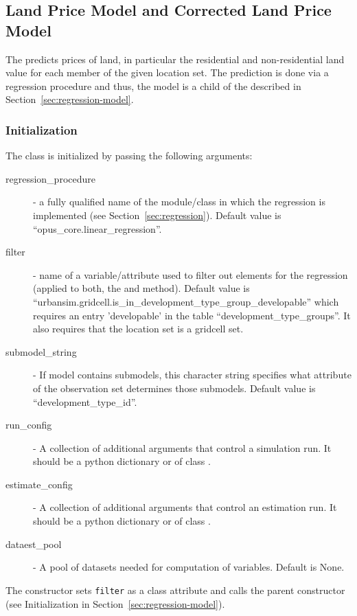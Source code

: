 \subsection{Land Price Model and Corrected Land Price Model}
\label{sec:land-price-model} 
\modelsindex
%
The  \modelsindex predicts prices of land, in particular the
residential and non-residential land value for each member of the given
location set. The prediction is done via a regression procedure and thus,
the model \modelsindex is a child of the  \modelsindex described in
Section~\ref{sec:regression-model}.

\subsubsection{Initialization}
%
The class is initialized by passing the following arguments:
\begin{description}
\item[regression_procedure] - a fully qualified name of the module/class in
  which the regression is implemented (see
  Section~\ref{sec:regression}). Default value is
  ``opus_core.linear_regression''.
\item[filter] - name of a variable/attribute used to filter out elements for
  the regression (applied to both, the  and 
  method). Default value is
  ``urbansim.gridcell.is_in_development_type_group_developable'' which requires an entry 'developable'
  in the table ``development_type_groups''. %
  It also requires that the location set is a gridcell set.
\item[submodel_string] - If model \modelsindex contains submodels, this character string
  specifies what attribute of the observation set determines those
  submodels. Default value is ``development_type_id''.
\item[run_config] - A collection of additional arguments that control a
  simulation run. It should be a python dictionary or of class .
\item[estimate_config] - A collection of additional arguments that control an
  estimation run. It should be a python dictionary or of class .
  \item[dataest_pool] - A pool of datasets needed for computation of variables. Default is None.
\end{description}
The constructor sets \verb|filter| as a class attribute \attributesindex and calls the parent
constructor (see Initialization in Section~\ref{sec:regression-model}).

